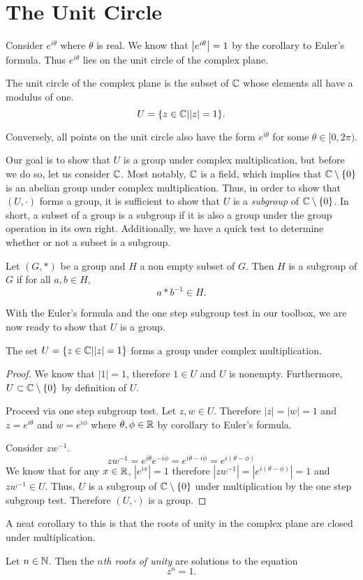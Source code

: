 \documentclass[notitlepage]{simple}
\begin{document}
\section{The Unit Circle}

Consider $e^{i\theta}$ where $\theta$ is real.
We know that $\left| e^{i\theta} \right|=1$ by the corollary to Euler's formula.
Thus $e^{i\theta}$ lies on the unit circle of the complex plane.
\begin{definition}
	The unit circle of the complex plane is the subset of $\mathbb{C}$ whose elements all have a modulus of one.
	\[
		U = \lbrace z\in\mathbb{C} | |z|=1 \rbrace.
	\]
\end{definition}
Conversely, all points on the unit circle also have the form $e^{i\theta}$ for some $\theta\in[0,2\pi)$.

Our goal is to show that $U$ is a group under complex multiplication, but before we do so, let us consider $\mathbb{C}$.
Most notably, $\mathbb{C}$ is a field, which implies that $\mathbb{C}\setminus\lbrace 0 \rbrace$ is an abelian group under complex multiplication.
Thus, in order to show that $(U,\cdot)$ forms a group, it is sufficient to show that $U$ is a \textit{subgroup} of $\mathbb{C}\setminus\lbrace 0 \rbrace$.
In short, a subset of a group is a subgroup if it is also a group under the group operation in its own right.
Additionally, we have a quick test to determine whether or not a subset is a subgroup.

\begin{proposition}
	Let $(G,*)$ be a group and $H$ a non empty subset of $G$.
	Then $H$ is a subgroup of $G$ if for all $a,b\in H$,
	\[
		a*b^{-1}\in H.
	\]
\end{proposition}

With the Euler's formula and the one step subgroup test in our toolbox, we are now ready to show that $U$ is a group.

\begin{thm}
	The set $U = \lbrace z\in\mathbb{C} | |z|=1 \rbrace$ forms a group under complex multiplication.
\end{thm}
\begin{proof}
	We know that $|1|=1$, therefore $1\in U$ and $U$ is nonempty.
	Furthermore, $U\subset\mathbb{C}\setminus\lbrace 0 \rbrace$ by definition of $U$.

	Proceed via one step subgroup test.
	Let $z,w\in U$.
	Therefore $|z|=|w|=1$ and $z=e^{i\theta}$ and $w=e^{i\phi}$ where $\theta,\phi\in\mathbb{R}$ by corollary to Euler's formula.

	Consider $zw^{-1}$.
	\[
		zw^{-1} = e^{i\theta}e^{-i\phi} = e^{i\theta - i\phi} = e^{i(\theta -\phi)}
	\]
	We know that for any $x\in\mathbb{R}$, $|e^{ix}|=1$ therefore $|zw^{-1}|=|e^{i(\theta - \phi)}|=1$ and $zw^{-1}\in U$.
	Thus, $U$ is a subgroup of $\mathbb{C}\setminus\lbrace 0 \rbrace$ under multiplication by the one step subgroup test.
	Therefore $(U,\cdot)$ is a group.
\end{proof}

A neat corollary to this is that the roots of unity in the complex plane are closed under multiplication.
\begin{definition}
	Let $n\in\mathbb{N}$.
	Then the \textit{$n$th roots of unity} are solutions to the equation
	\[
		z^n = 1.
	\]
\end{definition}
\end{document}
